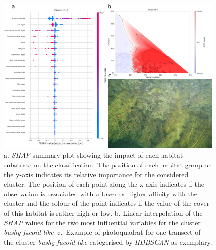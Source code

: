 \begin{figure}
\hypertarget{fig:26}{%
\centering
\includegraphics{03-Chapitre2/figures/supplementary/05-explanation_shap_pq_cluster_6.png}
\caption{a. \emph{SHAP} summary plot showing the impact of each habitat
substrate on the classification. The position of each habitat group on
the y-axis indicates its relative importance for the considered cluster.
The position of each point along the x-axis indicates if the observation
is associated with a lower or higher affinity with the cluster and the
colour of the point indicates if the value of the cover of this habitat
is rather high or low. b. Linear interpolation of the \emph{SHAP} values
for the two most influential variables for the cluster \emph{bushy
fucoid-like}. c.~Example of photoquadrat for one transect of the cluster
\emph{bushy fucoid-like} categorised by \emph{HDBSCAN} as
exemplary.}\label{fig:26}
}
\end{figure}

